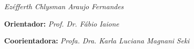 \begin{titlepage}





\vfill

\cleardoublepage



\vspace*{2cm}
\begin{center}

{\huge\sf \titulo}



\vspace*{2cm}

{\it Ezéfferth Chlysman Araujo Fernandes}

\vspace*{2cm}


{\bf Orientador:}  {\it Prof. Dr. Fábio Iaione}

{\bf Coorientadora:}  {\it Profa. Dra. Karla Luciana Magnani Seki}


\end{center}
\end{titlepage}
